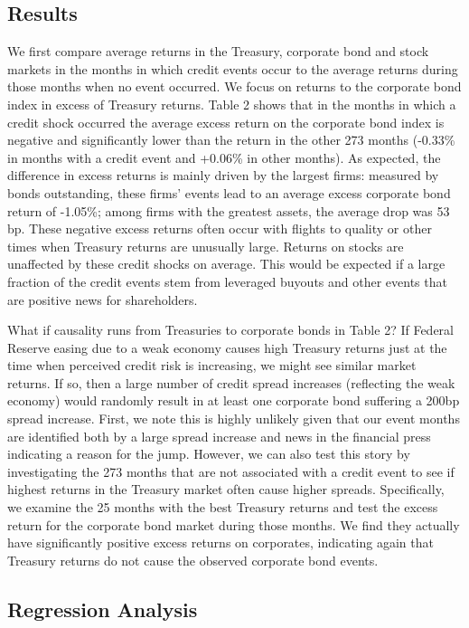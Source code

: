 \documentclass[titlepage,11pt]{article}
\begin{document}
\subsection{Results}

We first compare average returns in the Treasury, corporate bond and
stock markets in the months in which credit events occur to the
average returns during those months when no event occurred. We focus on
returns to the corporate bond index in excess of Treasury returns.
Table 2 shows that in the months in
which a credit shock occurred the average excess return on the
corporate bond index is negative and significantly lower than the
return in the other 273 months (-0.33\% in months with a credit
event and +0.06\% in other months). As expected, the difference in
excess returns is mainly driven by the largest firms: measured by
bonds outstanding, these firms' events lead to an average excess
corporate bond return of -1.05\%; among firms
with the greatest assets, the average drop was 53 bp. These negative
excess returns often occur with flights to quality or other times
when Treasury returns are unusually large. Returns on stocks are
unaffected by these credit shocks on average.  This would be
expected if a large fraction of the credit events stem from
leveraged buyouts and other events that are positive news for
shareholders.


What if causality runs from Treasuries to corporate bonds in
Table 2? If Federal Reserve easing due to a weak economy causes high
Treasury returns just at the time when perceived credit risk is increasing,
we might see similar market returns.  If
so, then a large number of credit spread increases (reflecting the
weak economy) would randomly result in at least one corporate bond
suffering a 200bp spread increase. First, we note this is highly unlikely given
that our event months are identified both by a large spread increase and news
in the financial press
indicating a reason for the jump.  However,  we can also test this story by
investigating the 273 months that are not associated with a credit event to see
if highest returns in the Treasury market often
cause higher spreads. Specifically, we examine the 25 months with the best
Treasury returns and test the  excess return for the corporate bond market
during
those months. We find they actually have significantly positive excess returns
on corporates, indicating again that Treasury returns do not cause the observed
corporate bond events.

\subsection{Regression Analysis}\label{regression}
\end{document}
